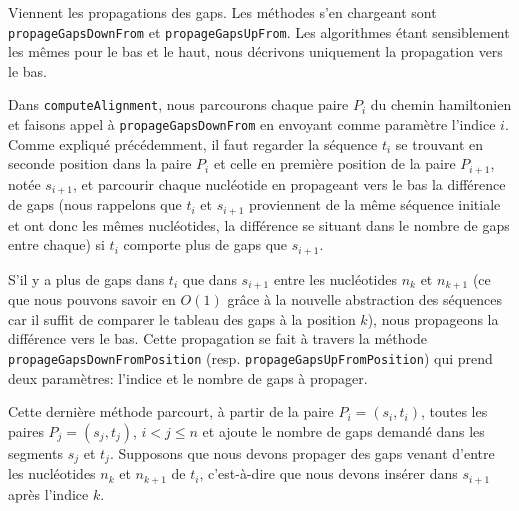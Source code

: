 Viennent les propagations des gaps.
Les méthodes s'en chargeant sont
\verb|propageGapsDownFrom| et \verb|propageGapsUpFrom|. Les algorithmes étant
sensiblement les mêmes pour le bas et le haut, nous décrivons uniquement la
propagation vers le bas.

Dans \verb|computeAlignment|, nous parcourons chaque paire $P_{i}$ du chemin
hamiltonien et faisons appel à \verb|propageGapsDownFrom| en envoyant comme
paramètre l'indice $i$. Comme expliqué précédemment, il faut regarder la
séquence $t_{i}$ se trouvant en seconde position dans la paire $P_{i}$ et celle en
première position de la paire $P_{i + 1}$, notée $s_{i + 1}$, et parcourir chaque nucléotide en
propageant vers le bas la différence de gaps (nous rappelons que $t_{i}$ et
$s_{i + 1}$ proviennent de la même séquence initiale et ont donc les mêmes
nucléotides, la différence se situant dans le nombre de gaps entre
chaque) si $t_{i}$ comporte plus de gaps que $s_{i + 1}$.

S'il y a plus de gaps dans $t_{i}$ que dans $s_{i + 1}$ entre les
nucléotides $n_{k}$ et $n_{k + 1}$ (ce que nous pouvons savoir en $O(1)$ grâce à
la nouvelle abstraction des séquences car il suffit de comparer le tableau des
gaps à la position $k$), nous propageons la différence vers le bas.
Cette propagation se fait à travers la méthode
\verb|propageGapsDownFromPosition| (resp. \verb|propageGapsUpFromPosition|) qui
prend deux paramètres: l'indice et le nombre de gaps à propager.

Cette dernière méthode parcourt, à partir de la paire $P_{i} = (s_{i}, t_{i})$,
toutes les paires $P_{j} = (s_{j}, t_{j})$, $i < j \leq n$ et ajoute le nombre
de gaps demandé dans les segments $s_{j}$ et $t_{j}$. Supposons que nous devons
propager des gaps venant d'entre les nucléotides $n_{k}$ et $n_{k + 1}$ de
$t_{i}$, c'est-à-dire que nous devons insérer dans $s_{i + 1}$ après l'indice
$k$.

